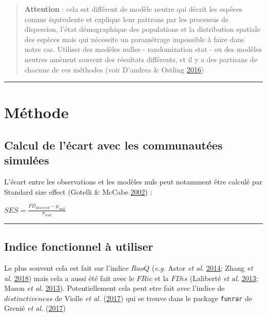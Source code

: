 \documentclass[]{article}
\begin{document}
\begin{quote}
\textbf{Attention} : cela est différent de modèle neutre qui décrit les
espèces comme équivalente et explique leur pattrons par les processus de
dispersion, l'état démographique des populations et la distribution
spatiale des espèces mais qui nécessite un paramétrage impossible à
faire dans notre cas. Utiliser des modèles nulles - randomization stat -
ou des modèles neutres amènent souvent des résultats différents, et il y
a des partisans de chacune de ces méthodes (voir D'andrea \& Ostling
\protect\hyperlink{ref-dandrea_ostling2016}{2016})
\end{quote}

\begin{center}\rule{0.5\linewidth}{\linethickness}\end{center}

\section{\texorpdfstring{ \textbf{Méthode} }{ Méthode }}\label{methode}

\subsection{\texorpdfstring{\textbf{Calcul de l'écart avec les
communautées
simulées}}{Calcul de l'écart avec les communautées simulées}}\label{calcul-de-lecart-avec-les-communautees-simulees}

L'écart entre les observations et les modèles nuls peut notamment être
calculé par Standard size effect (Gotelli \& McCabe
\protect\hyperlink{ref-gotelli_mccabe2002}{2002}) :

\(SES = \frac{FD_{observed} - \mu_{null}}{\sigma_{null}}\)

\begin{center}\rule{0.5\linewidth}{\linethickness}\end{center}

\subsection{\texorpdfstring{\textbf{Indice fonctionnel à
utiliser}}{Indice fonctionnel à utiliser}}\label{indice-fonctionnel-a-utiliser}

Le plus souvent cela est fait sur l'indice \(RaoQ\) (\emph{e.g.} Astor
\emph{et al.} \protect\hyperlink{ref-astor2014trait_dispersion}{2014};
Zhang \emph{et al.} \protect\hyperlink{ref-zhang2018}{2018}) mais cela a
aussi été fait avec le \(FRic\) et la \(FDis\) (Laliberté \emph{et al.}
\protect\hyperlink{ref-laliberte2013}{2013}; Mason \emph{et al.}
\protect\hyperlink{ref-mason2013}{2013}). Potentiellement cela peut etre
fait avec l'indice de \(distinctiveness\) de Violle \emph{et al.}
(\protect\hyperlink{ref-violle2017functional_rarity}{2017}) qui se
trouve dans le package \texttt{funrar} de Grenié \emph{et al.}
(\protect\hyperlink{ref-grenie2017funrar}{2017})
\end{document}
